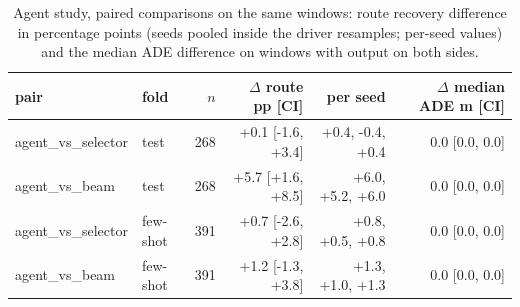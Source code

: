 \begin{table}[t]\centering\scriptsize\setlength{\tabcolsep}{3pt}
\caption{Agent study, paired comparisons on the same windows: route recovery difference in percentage points (seeds pooled inside the driver resamples; per-seed values) and the median ADE difference on windows with output on both sides.}\label{tab:supp_agent_pairs}
\begin{tabular}{llrrrr}\toprule
pair & fold & $n$ & $\Delta$ route pp [CI] & per seed & $\Delta$ median ADE m [CI] \\\midrule
agent\_vs\_selector & test & 268 & +0.1 [-1.6, +3.4] & +0.4, -0.4, +0.4 & 0.0 [0.0, 0.0] \\
agent\_vs\_beam & test & 268 & +5.7 [+1.6, +8.5] & +6.0, +5.2, +6.0 & 0.0 [0.0, 0.0] \\
agent\_vs\_selector & few-shot & 391 & +0.7 [-2.6, +2.8] & +0.8, +0.5, +0.8 & 0.0 [0.0, 0.0] \\
agent\_vs\_beam & few-shot & 391 & +1.2 [-1.3, +3.8] & +1.3, +1.0, +1.3 & 0.0 [0.0, 0.0] \\
\bottomrule\end{tabular}
\end{table}
